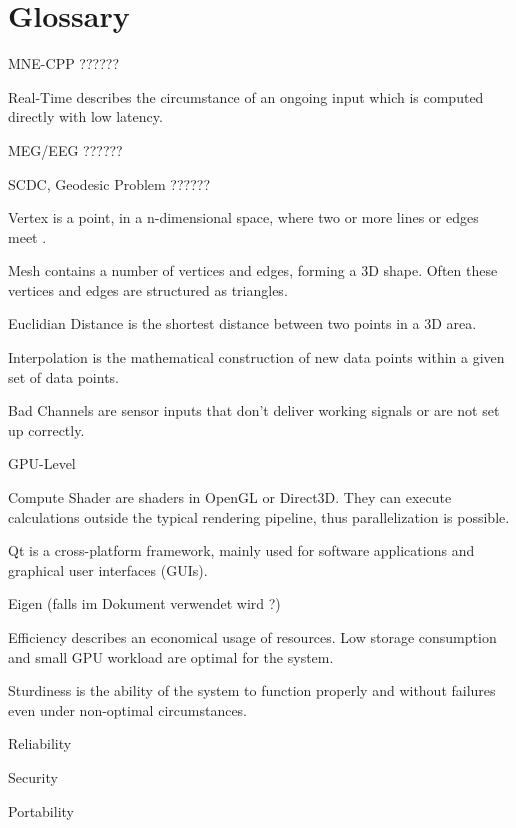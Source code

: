 \section{Glossary}

\begin{aims}
	
	\item[MNE-CPP ??????]
	\item[Real-Time] describes the circumstance of an ongoing input which is computed directly with low latency.
	
	\item[MEG/EEG ??????] 
	\item[SCDC, Geodesic Problem ??????]
	\item[Vertex] is a point, in a n-dimensional space, where two or more lines or edges meet .
	\item[Mesh]	contains a number of vertices and edges, forming a 3D shape. Often these vertices and edges are structured as 					triangles.	
	\item[Euclidian Distance] is the shortest distance between two points in a 3D area.
	\item[Interpolation] is the mathematical construction of new data points within a given set of data points.
	\item[Bad Channels] are sensor inputs that don't deliver working signals or are not set up correctly.
	\item[GPU-Level]
	\item[Compute Shader] are shaders in OpenGL or Direct3D. They can execute calculations outside the typical rendering 								  pipeline, thus parallelization is possible.
	\item[Qt] is a cross-platform framework, mainly used for software applications and graphical user interfaces (GUIs). 
	\item[Eigen (falls im Dokument verwendet wird ?)]
	\item[Efficiency] describes an economical usage of resources. Low storage consumption and small GPU workload are optimal 					  	  for the system.
	\item[Sturdiness] is the ability of the system to function properly and without failures even under non-optimal 								  circumstances. 
	\item[Reliability]
	\item[Security]
	\item[Portability] 

\end{aims}